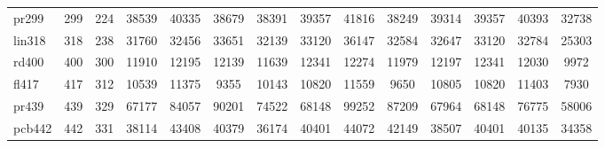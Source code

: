 \begin{table}[htbp]
{{\begin{tabular}{|l|c|c|c|c|c|c|c|c|c|c|c|c|c|}
pr299 & 299 & 224 & 38539 & 40335 & 38679 & 38391 & 39357 & 41816 & 38249 & 39314 & 39357 & 40393 & 32738 \\
lin318 & 318 & 238 & 31760 & 32456 & 33651 & 32139 & 33120 & 36147 & 32584 & 32647 & 33120 & 32784 & 25303 \\
rd400 & 400 & 300 & 11910 & 12195 & 12139 & 11639 & 12341 & 12274 & 11979 & 12197 & 12341 & 12030 & 9972 \\
fl417 & 417 & 312 & 10539 & 11375 & 9355 & 10143 & 10820 & 11559 & 9650 & 10805 & 10820 & 11403 & 7930 \\
pr439 & 439 & 329 & 67177 & 84057 & 90201 & 74522 & 68148 & 99252 & 87209 & 67964 & 68148 & 76775 & 58006 \\
pcb442 & 442 & 331 & 38114 & 43408 & 40379 & 36174 & 40401 & 44072 & 42149 & 38507 & 40401 & 40135 & 34358 \\
\hline
\end{tabular}}}
\end{table}

